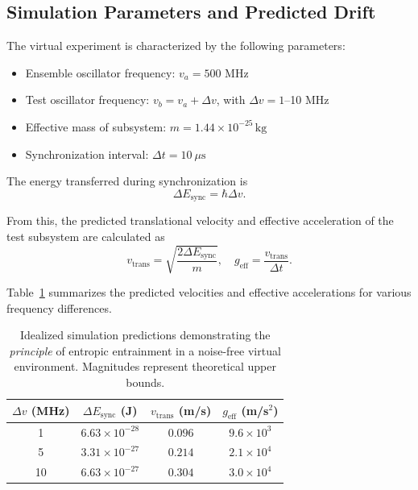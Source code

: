 \documentclass[
 reprint,
 amsmath,amssymb,
 aps,
 prb,
]{revtex4-2}
\numberwithin{equation}{section}
\begin{document}
\subsection{Simulation Parameters and Predicted Drift}

The virtual experiment is characterized by the following parameters:

\begin{itemize}
\item Ensemble oscillator frequency: $v_a = 500$ MHz
\item Test oscillator frequency: $v_b = v_a + \Delta v$, with $\Delta v = 1$--10 MHz
\item Effective mass of subsystem: $m = 1.44\times10^{-25}\,\mathrm{kg}$
\item Synchronization interval: $\Delta t = 10~\mu\mathrm{s}$
\end{itemize}

The energy transferred during synchronization is
\begin{equation}
\Delta E_\text{sync} = \hbar \Delta v.
\end{equation}

From this, the predicted translational velocity and effective acceleration of the test subsystem are calculated as
\begin{equation}
v_\text{trans} = \sqrt{\frac{2 \Delta E_\text{sync}}{m}}, \quad
g_\text{eff} = \frac{v_\text{trans}}{\Delta t}.
\end{equation}

Table~\ref{tab:idealized_predictions} summarizes the predicted velocities and effective accelerations for various frequency differences.

\begin{table}[t!]
\centering
\begin{tabular*}{\columnwidth}{@{\extracolsep{\fill}}cccc@{}}
\toprule
$\Delta v$ (MHz) & $\Delta E_\text{sync}$ (J) & $v_\text{trans}$ (m/s) & $g_\text{eff}$ (m/s$^2$) \\
\midrule
1  & $6.63\times10^{-28}$ & $0.096$ & $9.6\times10^3$ \\
5  & $3.31\times10^{-27}$ & $0.214$ & $2.1\times10^4$ \\
10 & $6.63\times10^{-27}$ & $0.304$ & $3.0\times10^4$ \\
\bottomrule
\end{tabular*}
\caption{\justifying Idealized simulation predictions demonstrating the \textit{principle} of entropic entrainment in a noise-free virtual environment. Magnitudes represent theoretical upper bounds.}
\label{tab:idealized_predictions}
\end{table}
\end{document}
